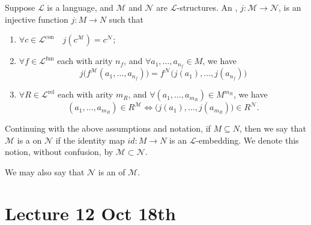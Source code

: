 \documentclass[notoc,notitlepage]{tufte-book}
\DeclareMathOperator{\con}{con}
\DeclareMathOperator{\fun}{fun}
\DeclareMathOperator{\rel}{rel}
\begin{document}
\begin{defn}\label{defn:l_embedding}
  Suppose $\mathcal{L}$ is a language, and $\mathcal{M}$ and $\mathcal{N}$ are $\mathcal{L}$-structures. An , $j : \mathcal{M} \to \mathcal{N}$, is an injective function $j : M \to N$ such that
  \begin{enumerate}
    \item $\forall c \in \mathcal{L}^{\con} \quad j(c^\mathcal{M}) = c^\mathcal{N}$;
    \item $\forall f \in \mathcal{L}^{\fun}$ each with arity $n_f$, and $\forall a_1, \ldots, a_{n_f} \in M$, we have
      \begin{equation*}
        j\big( f^\mathcal{M}(a_1, \ldots, a_{n_f}) \big) = f^\mathcal{N} \big( j(a_1), \ldots, j(a_{n_f}) \big)
      \end{equation*}
    \item $\forall R \in \mathcal{L}^{\rel}$ each with arity $m_R$, and $\forall (a_1, \ldots, a_{m_R}) \in M^{m_R}$, we have
      \begin{equation*}
        (a_1, \ldots, a_{m_R}) \in R^\mathcal{M} \iff \big( j(a_1), \ldots, j(a_{m_R}) \big) \in R^\mathcal{N}.
      \end{equation*}
  \end{enumerate}
\end{defn}

\begin{defn}[Substructure]\label{defn:substructure}
  Continuing with the above assumptions and notation, if $M \subseteq N$, then we say that $\mathcal{M}$ is a  on $\mathcal{N}$ if the identity map $id : M \to N$ is an $\mathcal{L}$-embedding. We denote this notion, without confusion, by $\mathcal{M} \subset \mathcal{N}$.

  We may also say that $\mathcal{N}$ is an  of $\mathcal{M}$.
\end{defn}




\chapter{Lecture 12 Oct 18th}%
\label{chp:lecture_12_oct_18th}
\end{document}
